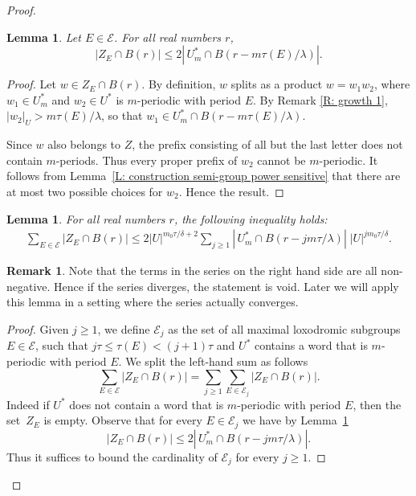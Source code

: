 \documentclass[JEP,XML,SOM,Unicode, NoEqCountersInSection,published]{cedram}
\let\mathcal\mathscr
\theoremstyle{plain}
\newtheorem{lem}[thm]{Lemma}
\theoremstyle{definition}
\newtheorem{rem}[thm]{Remark}
\begin{document}
\begin{proof}
\begin{lem}\label{L: growth 3} Let $E\in \mathcal{E}$.
For all real numbers $r$,
\begin{equation*}
|Z_E\cap B(r)| \leqslant 2 |\, U^*_m \cap B\left(r-m \tau(E)/\lambda\right)|.
\end{equation*}
\end{lem}
\begin{proof}
Let $w\in Z_E\cap B(r)$. By definition, $w$ splits as a product $w=w_1w_2$, where $w_1 \in U^*_m$ and $w_2\in U^*$ is $m$-periodic with period $E$.
By Remark \ref{R: growth 1}, $|w_2|_U> m \tau(E)/\lambda$, so that $w_1 \in U^*_m \cap B(r-m \tau(E)/\lambda)$.

Since $w$ also belongs to $Z$, the prefix consisting of all but the last letter does not contain $m$-periods.
Thus every proper prefix of $w_2$ cannot be $m$-periodic.
It follows from Lemma~\ref{L: construction semi-group power sensitive} that there are at most two possible choices for $w_2$.
Hence the result.
\end{proof}

\begin{lem}\label{I: growth 3} For all real numbers $r$, the following inequality holds:
\begin{align*}
\sum_{E\in \mathcal{E}} |Z_E\cap B(r)| \leqslant
2|U|^{m_0\tau/\delta +2}
\sum_{j\geqslant 1} |\, U^*_m \cap B\left(r -jm\tau/\lambda\right)|\; |U|^{ jm_0\tau/\delta}.
\end{align*}
\end{lem}

\begin{rem}
Note that the terms in the series on the right hand side are all non-negative.
Hence if the series diverges, the statement is void.
Later we will apply this lemma in a setting where the series actually converges.
\end{rem}

\begin{proof}
Given $j \geq 1$, we define $\mathcal E_j$ as the set of all maximal loxodromic subgroups $E \in \mathcal E$, such that $j\tau \leq \tau(E) < (j+1)\tau$ and $U^*$ contains a word that is $m$-periodic with period $E$.
We split the left-hand sum as follows
\begin{equation*}
\sum_{E\in \mathcal{E}} |Z_E\cap B(r)|
= \sum_{j \geq 1} \sum_{E\in \mathcal{E}_j} |Z_E\cap B(r)|.
\end{equation*}
Indeed if $U^*$ does not contain a word that is $m$-periodic with period $E$, then the set~$Z_E$ is empty.
Observe that for every $E \in \mathcal E_j$ we have by Lemma~\ref{L: growth 3}
\begin{equation*}
|Z_E\cap B(r)| \leqslant 2 |\, U^*_m \cap B\left(r -jm\tau/\lambda\right)|.
\end{equation*}
Thus it suffices to bound the cardinality of $\mathcal E_j$ for every $j \geq 1$.


\end{proof}
\end{proof}
\end{document}
